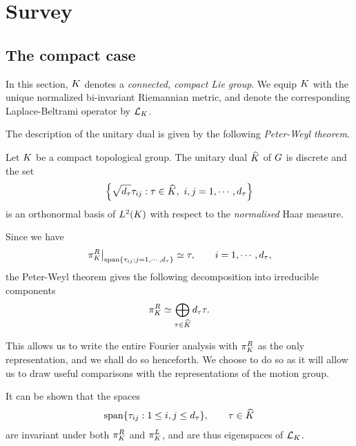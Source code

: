 \chapter{Survey}
\section{The compact case}

In this section,
$\CompactGroup$ denotes a \emph{connected, compact Lie group}.
We equip $\CompactGroup$ with the unique normalized bi-invariant Riemannian metric,
and denote the corresponding Laplace-Beltrami operator by $\Laplacian [\CompactGroup]$.

The description of the unitary dual is given by the following \emph{Peter-Weyl theorem}.

\begin{theorem}
\label{theorem:Peter-Weyl_theorem}
    Let $\CompactGroup$ be a compact topological group.
    The unitary dual $\dualGroup \CompactGroup$ of $\Group$ is discrete and
    the set
    \begin{align*}
        \left\{
            \sqrt{\dimRep\tau} \tau_{ij} : \tau \in \dualGroup\CompactGroup,\ i, j = 1, \cdots, \dimRep\tau
        \right\}
    \end{align*}
    is an orthonormal basis of $\Lebesgue{2}{\CompactGroup}$ with respect to the \emph{normalised} Haar measure.
\end{theorem}

Since we have
\begin{align*}
    \eval \RightRegularRepresentation {\Span \{\tau_{i j} : j = 1, \cdots, \dimRep \tau\}} \simeq \tau,
    \qquad i = 1, \cdots, \dimRep \tau,
\end{align*}
the Peter-Weyl theorem gives the following decomposition into irreducible components
\begin{align*}
    \RightRegularRepresentation \simeq \bigoplus_{\tau \in \dualGroup \CompactGroup} \dimRep \tau \tau.
\end{align*}

This allows us to write the entire Fourier analysis with $\RightRegularRepresentation$ as the only representation,
and we shall do so henceforth.
We choose to do so as it will allow us to draw useful comparisons with the representations of the motion group.

It can be shown that the spaces
\begin{align*}
    \Span \{ \tau_{i j} : 1 \leq i, j \leq \dimRep \tau\}, \qquad \tau \in \dualGroup \CompactGroup
\end{align*}
are invariant under both $\RightRegularRepresentation$ and $\LeftRegularRepresentation$,
and are thus eigenspaces of $\Laplacian [\CompactGroup]$.

